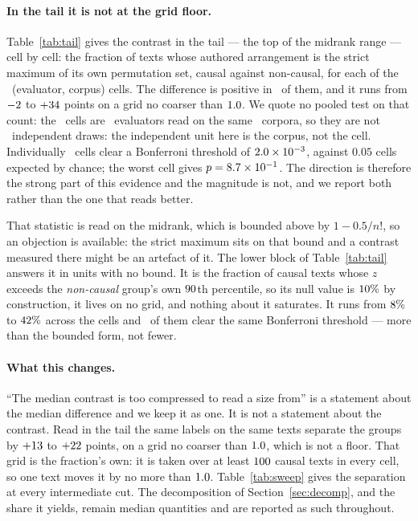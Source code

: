 \paragraph{In the tail it is not at the grid floor.}
Table~\ref{tab:tail} gives the contrast in the tail --- the top of the
midrank range --- cell by cell: the fraction of texts whose authored arrangement is the strict
maximum of its own permutation set, causal against non-causal, for each of
the \TailNCells\ (evaluator, corpus) cells.  The difference is positive in
\TailNPositive\ of them, and it runs from $-2$ to $+34$
points on a grid no coarser than $1.0$.  We quote no pooled test
on that count: the \TailNCells\ cells are \TrendNEval\ evaluators read on the
same \NCorp\ corpora, so they are not \TailNCells\ independent draws: the
independent unit here is the corpus, not the cell.  Individually \TailNRejecting\ cells clear a
Bonferroni threshold of $2.0\times10^{-3}$, against $0.05$ cells expected by
chance; the worst cell gives $p = 8.7\times10^{-1}$.  The direction is therefore
the strong part of this evidence and the magnitude is not, and we report
both rather than the one that reads better.

That statistic is read on the midrank, which is bounded above by
$1 - 0.5/n!$, so an objection is available: the strict maximum sits on that
bound and a contrast measured there might be an artefact of it.  The lower
block of Table~\ref{tab:tail} answers it in units with no bound.  It is
the fraction of causal texts whose $z$ exceeds the
\emph{non-causal} group's own $90$th percentile, so its null value is
$10\%$ by construction, it lives on no grid, and nothing about it
saturates.  It runs from $8\%$ to $42\%$ across the cells
and \TailZNRejecting\ of them clear the same Bonferroni threshold --- more
than the bounded form, not fewer.

\paragraph{What this changes.}
``The median contrast is too compressed to read a size from'' is a
statement about the median difference and we keep it as one.  It is not a statement
about the contrast.  Read in the tail the same labels on the
same texts separate the groups by $+13$ to $+22$
points, on a grid no coarser than $1.0$, which is not a floor.
That grid is the fraction's own: it is taken over at least $100$
causal texts in every cell, so one text moves it by no more than
$1.0$.
Table~\ref{tab:sweep} gives the separation at every intermediate cut.  The
decomposition of Section~\ref{sec:decomp}, and the share it yields, remain
median quantities and are reported as such throughout.

